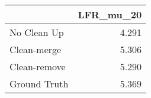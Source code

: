\begin{tabular}{lr}
\toprule
{} & LFR_mu_20 \\
\midrule
No Clean Up  &     4.291 \\
Clean-merge  &     5.306 \\
Clean-remove &     5.290 \\
Ground Truth &     5.369 \\
\bottomrule
\end{tabular}
